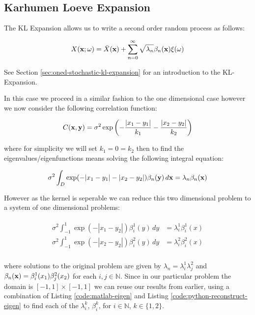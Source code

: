 \subsection{Karhumen Loeve Expansion}

The KL Expansion allows us to write a second order random process as follows:

\begin{equation}
    X(\mathbf{x};\omega) = \bar{X}(\mathbf{x}) +
        \sum_{n=0}^\infty\sqrt{\lambda_n}\beta_n(\mathbf{x})\xi(\omega)
\end{equation}

See Section \ref{sec:oned-stochastic-kl-expansion} for an introduction to the
KL-Expansion.

In this case we proceed in a similar fashion to the one dimensional case
however we now consider the following correlation function:

\begin{equation}
    C(\mathbf{x}, \mathbf{y}) =
        \sigma^2\exp{\left(-\frac{|x_1 - y_1|}{k_1} - \frac{|x_2 - y_2|}{k_2}\right)}
\end{equation}

where for simplicity we will set $k_1 = 0 = k_2$ then to find the
eigenvalues/eigenfunctions means solving the following integral equation:

\begin{equation}\label{eq:twod-stochastic-kl-eigenvalue-problem}
    \sigma^2\int_D\exp(-|x_1 - y_1| - |x_2 - y_2|)\beta_n(\mathbf{y})\, d\mathbf{x}
        = \lambda_n\beta_n(\mathbf{x})
\end{equation}

However as the kernel is seperable we can reduce this two dimensional problem
to a system of one dimensional problems:

\begin{align}
    \begin{split}
        \sigma^2\int_{-1}^1\exp(-|x_1 - y_2|)\beta^1_i(y)\, dy &= \lambda^1_i\beta^1_i(x) \\
        \sigma^2\int_{-1}^1\exp(-|x_2 - y_2|)\beta^2_i(y)\, dy &= \lambda^2_i\beta^2_i(x) \\
    \end{split}
\end{align}

where solutions to the original problem
 are given by $\lambda_n =
\lambda^1_i\lambda^2_j$ and $\beta_n(\mathbf{x}) = \beta^1_i(x_1)\beta^2_j(x_2)$ for
each $i, j \in \mathbb{N}$. Since in our particular problem the domain is $[-1,
1] \times [-1, 1]$ we can reuse our results from earlier, using a combination
of Listing \ref{code:matlab-eigen} and Listing
\ref{code:python-reconstruct-eigen} to find each of the $\lambda_i^k$,
$\beta_i^k$, for $i \in \mathbb{N}$, $k \in \{1, 2\}$.

